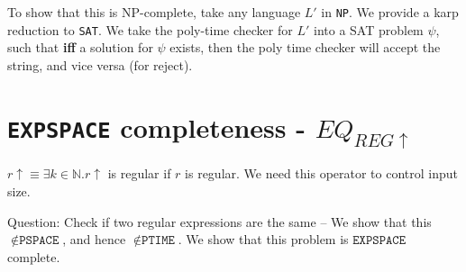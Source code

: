 To show that this is NP-complete, take any language $L'$ in \texttt{NP}. We provide
a karp reduction to \texttt{SAT}. We take the poly-time checker for $L'$ into a
SAT problem $\psi$, such that \textbf{iff} a solution for $\psi$ exists, then the poly
time checker will accept the string, and vice versa (for reject).



\section{\texttt{EXPSPACE} completeness - $EQ_{REG\uparrow}$}
$r \uparrow \equiv \exists k \in \mathbb{N}. r \uparrow$ is regular if $r$ is
regular.  We need this operator to control input size.

Question: Check if two regular expressions are the same -- We show that
this $\notin \texttt{PSPACE}$, and hence $\notin \texttt{PTIME}$. We show that
this problem is $\texttt{EXPSPACE}$ complete.
